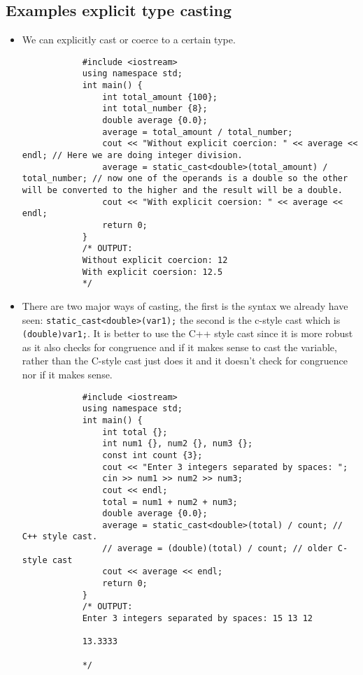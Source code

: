 \subsection{Examples explicit type casting}
\begin{itemize}
    \item We can explicitly cast or coerce to a certain type.
        \begin{verbatim}
            #include <iostream>
            using namespace std;
            int main() {
                int total_amount {100};
                int total_number {8};
                double average {0.0};
                average = total_amount / total_number;
                cout << "Without explicit coercion: " << average << endl; // Here we are doing integer division.
                average = static_cast<double>(total_amount) / total_number; // now one of the operands is a double so the other will be converted to the higher and the result will be a double.
                cout << "With explicit coersion: " << average << endl;
                return 0;
            }
            /* OUTPUT:
            Without explicit coercion: 12
            With explicit coersion: 12.5
            */
        \end{verbatim}
    
    \item There are two major ways of casting, the first is the syntax we already have seen: \texttt{static_cast<double>(var1);} the second is the c-style cast which is \texttt{(double)var1;}. It is better to use the C++ style cast since it is more robust as it also checks for congruence and if it makes sense to cast the variable, rather than the C-style cast just does it and it doesn't check for congruence nor if it makes sense.
        \begin{verbatim}
            #include <iostream>
            using namespace std;
            int main() {
                int total {};
                int num1 {}, num2 {}, num3 {};
                const int count {3};
                cout << "Enter 3 integers separated by spaces: ";
                cin >> num1 >> num2 >> num3;
                cout << endl;
                total = num1 + num2 + num3;
                double average {0.0};
                average = static_cast<double>(total) / count; // C++ style cast.
                // average = (double)(total) / count; // older C-style cast
                cout << average << endl;
                return 0;
            }
            /* OUTPUT:
            Enter 3 integers separated by spaces: 15 13 12

            13.3333

            */
        \end{verbatim}
\end{itemize}


